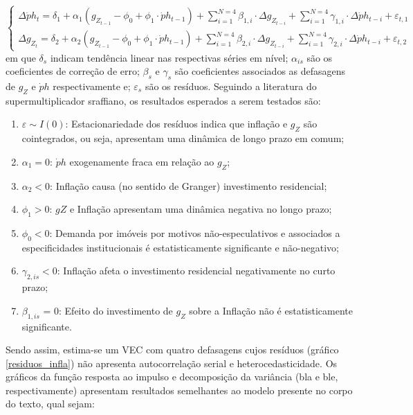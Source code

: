 \begin{equation}
\begin{cases}
\Delta \dot ph_t = \delta_{1} + \alpha_1(g_{Z_{t-1}} - \phi_0 + \phi_1\cdot \dot ph_{t-1}) + \sum^{N=4}_{i=1}\beta_{1,i}\cdot \Delta g_{Z_{t-i}} +
\sum^{N=4}_{i=1}\gamma_{1,i}\cdot \Delta \dot ph_{t-i} +\varepsilon_{t,1}
\\
\Delta g_{Z_{t}} = \delta_{2} + \alpha_2(g_{Z_{t-1}} - \phi_0 + \phi_1\cdot \dot ph_{t-1}) + \sum^{N=4}_{i=1}\beta_{2,i}\cdot \Delta g_{Z_{t-i}} +
\sum^{N=4}_{i=1}\gamma_{2,i}\cdot \Delta \dot ph_{t-i} +\varepsilon_{t,2}
\end{cases}
\end{equation}
em que $\delta_s$ indicam tendência linear nas respectivas séries em nível;
$\alpha_{is}$ são os coeficientes de correção de erro; 
$\beta_s$ e $\gamma_s$ são coeficientes associados as defasagens de  $g_Z$ e $\dot ph$ respectivamente e; $\varepsilon_s$ são os resíduos.
Seguindo a literatura do supermultiplicador sraffiano, os resultados esperados a serem testados são:
\begin{enumerate}
	\item $\varepsilon \sim I(0)$: Estacionariedade dos resíduos indica que inflação e $g_Z$ são cointegrados, ou seja, apresentam uma dinâmica de longo prazo em comum;
	\item $\alpha_1 = 0$: $\dot ph$ exogenamente fraca em relação ao $g_Z$;
	\item $\alpha_2 < 0$: Inflação causa (no sentido de Granger) investimento residencial;
	\item $\phi_1 > 0$: $gZ$ e Inflação apresentam uma dinâmica negativa no longo prazo;
	\item $\phi_0 < 0$: Demanda por imóveis por motivos não-especulativos e associados a especificidades institucionais é estatisticamente significante e não-negativo;
	\item $\gamma_{2,is} < 0$: Inflação afeta o investimento residencial negativamente no curto prazo;
	\item $\beta_{1,is}$ = 0: Efeito do investimento de $g_Z$ sobre a Inflação não é estatisticamente significante.
\end{enumerate}


Sendo assim, estima-se um VEC com quatro defasagens cujos resíduos (gráfico \ref{residuos_infla}) não apresenta autocorrelação serial e heterocedasticidade.
Os gráficos da função resposta ao impulso e decomposição da variância (bla e ble, respectivamente) apresentam resultados semelhantes ao modelo presente no corpo do texto, qual sejam:



